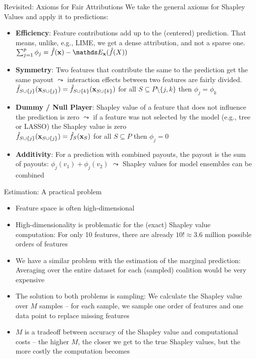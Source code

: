 \documentclass[11pt,compress,t,notes=noshow, aspectratio=169, xcolor=table]{beamer}
\begin{document}
\begin{frame}{Revisited: Axioms for Fair Attributions}
  We take the general axioms for Shapley Values and apply it to predictions:
  \vspace{0.25cm}
  \begin{itemize}
  \itemsep1em
    \item \textbf{Efficiency}: Feature contributions add up to the (centered) prediction. That means, unlike, e.g., LIME, we get a dense attribution, and not a sparse one.
      $\sum\nolimits_{j=1}^p\phi_j=\fh(\xv)-\E_{\xv}(\fh(X))$
    \item \textbf{Symmetry}: Two features that contribute the same to the prediction get the same payout $\leadsto$ interaction effects between two features are fairly divided. \\
      $\fh_{S\cup\{j\}}(\xv_{\Scupj}) = \fh_{\Scupk}(\xv_{\Scupk})$ for all $S \subseteq P\setminus\{j,k\}$ then $\phi_j=\phi_k$
    \item \textbf{Dummy / Null Player}: Shapley value of a feature that does not influence the prediction is zero $\leadsto$ if a feature was not selected by the model (e.g., tree or LASSO) the Shapley value is zero  \\
      $\fh_{\Scupj}(\xv_{\Scupj})=\fhS(\xv_S)$ for all $S \subseteq P$ then $\phi_j=0$
    \item \textbf{Additivity}:  For a prediction with combined payouts, the
      payout is the sum of payouts: $\phi_j(v_1) + \phi_j(v_2)$ $\leadsto$ Shapley values for model ensembles can be combined
  \end{itemize}
\end{frame}



\begin{frame}{Estimation: A practical problem}
  \begin{itemize}
  \itemsep1em
      \item Feature space is often high-dimensional
      \item High-dimensionality is problematic for the (exact) Shapley value computation: For only 10 features, there are already $10! \approx 3.6$ million possible orders of features
      \item We have a similar problem with the estimation of the marginal prediction: Averaging over the entire dataset for each (sampled) coalition would be very expensive
      \item The solution to both problems is sampling: We calculate the Shapley value over $M$ samples -- for each sample, we sample one order of features and one data point to replace missing features
      \item $M$ is a tradeoff between accuracy of the Shapley value and computational costs -- the higher $M$, the closer we get to the true Shapley values, but the more costly the computation becomes
  \end{itemize}
\end{frame}
\end{document}
